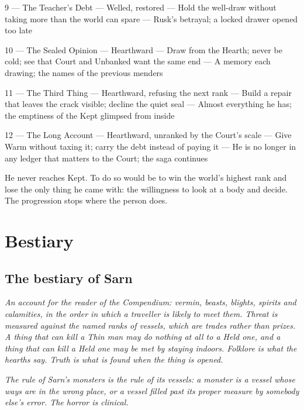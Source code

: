 \documentclass{design/chronicle}
\begin{document}
9 — The Teacher’s Debt — Welled, restored — Hold the well-draw without taking more than the world can spare — Rusk’s betrayal; a locked drawer opened too late\par

10 — The Sealed Opinion — Hearthward — Draw from the Hearth; never be cold; see that Court and Unbanked want the same end — A memory each drawing; the names of the previous menders\par

11 — The Third Thing — Hearthward, refusing the next rank — Build a repair that leaves the crack visible; decline the quiet seal — Almost everything he has; the emptiness of the Kept glimpsed from inside\par

12 — The Long Account — Hearthward, unranked by the Court’s scale — Give Warm without taxing it; carry the debt instead of paying it — He is no longer in any ledger that matters to the Court; the saga continues\par

He never reaches Kept. To do so would be to win the world’s highest rank and lose the only thing he came with: the willingness to look at a body and decide. The progression stops where the person does.

\chapter*{Bestiary}
\section*{The bestiary of Sarn}

\emph{An account for the reader of the Compendium: vermin, beasts, blights, spirits and calamities, in the order in which a traveller is likely to meet them. Threat is measured against the named ranks of vessels, which are trades rather than prizes. A thing that can kill a Thin man may do nothing at all to a Held one, and a thing that can kill a Held one may be met by staying indoors. Folklore is what the hearths say. Truth is what is found when the thing is opened.}

\emph{The rule of Sarn’s monsters is the rule of its vessels: a monster is a vessel whose ways are in the wrong place, or a vessel filled past its proper measure by somebody else’s error. The horror is clinical.}

\CRrule
\end{document}
